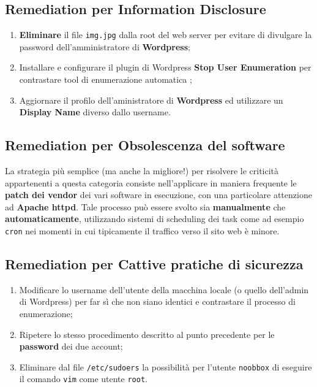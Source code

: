 \documentclass[a4paper, 12pt, oneside]{article}
\begin{document}
\subsection{Remediation per \textbf{Information Disclosure}}
\begin{enumerate}
    \item \textbf{Eliminare} il file \texttt{img.jpg} dalla root del web server per evitare di divulgare la password dell'amministratore di \textbf{Wordpress};
    \item Installare e configurare il plugin di Wordpress \textbf{Stop User Enumeration} per contrastare tool di enumerazione automatica \cite{sue};
    \item Aggiornare il profilo dell'aministratore di \textbf{Wordpress} ed utilizzare un \textbf{Display Name} diverso dallo username.
\end{enumerate}

\subsection{Remediation per \textbf{Obsolescenza del software}}
La strategia più semplice (ma anche la migliore!) per risolvere le criticità appartenenti a questa categoria consiste nell'applicare in maniera frequente le \textbf{patch dei vendor} dei vari software in esecuzione, con una particolare attenzione ad \textbf{Apache httpd}. Tale processo può essere svolto sia \textbf{manualmente} che \textbf{automaticamente}, utilizzando sistemi di scheduling dei task come ad esempio \texttt{cron} nei momenti in cui tipicamente il traffico verso il sito web è minore.

\newpage
\subsection{Remediation per \textbf{Cattive pratiche di sicurezza}}
\begin{enumerate}
    \item Modificare lo username dell'utente della macchina locale (o quello dell'admin di Wordpress) per far sì che non siano identici e contrastare il processo di enumerazione;
    \item Ripetere lo stesso procedimento descritto al punto precedente per le \textbf{password} dei due account;
    \item Eliminare dal file \texttt{/etc/sudoers} la possibilità per l'utente \texttt{noobbox} di eseguire il comando \texttt{vim} come utente \texttt{root}.
\end{enumerate}
\newpage
\end{document}
